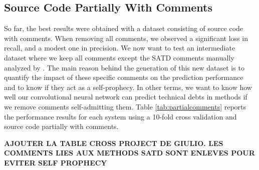 
\subsection{Source Code Partially With Comments}


So far, the best results were obtained with a dataset consisting of source code with comments. When removing all comments, we observed a significant loss in recall, and a modest one in precision. We now want to test an intermediate dataset where we keep all comments except the SATD comments manually analyzed by \citet{maldonado17}. The main reason behind the generation of this new dataset is to quantify the impact of these specific comments on the prediction performance and to know if they act as a self-prophecy. In other terms, we want to know how well our convolutional neural network can predict technical debts in methods if we remove comments self-admitting them. Table \ref{tab:partialcomments} reports the performance results for each system using a 10-fold cross validation and source code partially with comments.

\textbf{AJOUTER LA TABLE CROSS PROJECT DE GIULIO. LES COMMENTS LIES AUX METHODS SATD SONT ENLEVES POUR EVITER SELF PROPHECY}

\begin{table}[t]
	\caption{Within-project prediction: results of CNN for each system using source code partially with comments}
	\label{tab:partialcomments}
	\centering\tiny
	\vspace{-3mm}
\end{table}

